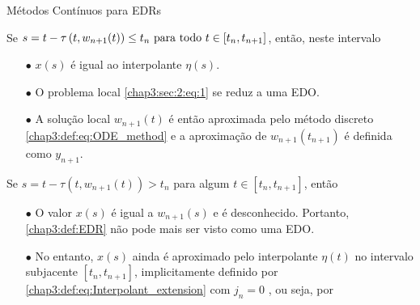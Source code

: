\documentclass{beamer}
\theoremstyle{plain}
\theoremstyle{definition}
\begin{document}
\begin{frame}{Métodos Contínuos para EDRs}

    Se \( s=t-\tau\left(t, w_{n+1}(t)\right) \leq t_{n}$ para todo $t \in\left[t_{n}, t_{n+1}\right]\), então, neste intervalo

    \begin{itemize}
        \item[$\bullet$] \( x(s) \) é igual ao interpolante \(\eta(s)\). 

        \item[$\bullet$]  O problema local \eqref{chap3:sec:2:eq:1} se reduz a uma EDO. 

        \item[$\bullet$] A solução local \( w_{n+1}(t) \) é então aproximada pelo método discreto \eqref{chap3:def:eq:ODE_method} e a aproximação de \( w_{n+1}\left(t_{n+1}\right) \) é definida como \( y_{n+1} \).

    \end{itemize}

    Se \( s=t-\tau\left(t, w_{n+1}(t)\right)>t_{n} \) para algum \( t \in\left[t_{n}, t_{n+1}\right] \), então

    \begin{itemize}
        \item[$\bullet$] O valor \( x(s) \) é igual a \( w_{n+1}(s) \) e é desconhecido. Portanto, \eqref{chap3:def:EDR} não pode mais ser visto como uma EDO. 

        \item[$\bullet$] No entanto, \( x(s) \) ainda é aproximado pelo interpolante \( \eta(t) \) no intervalo subjacente \( \left[t_{n}, t_{n+1}\right] \), implicitamente definido por \eqref{chap3:def:eq:Interpolant_extension} com \( j_{n}=0\) , ou seja, por
    \end{itemize}




\end{frame}


\end{document}
